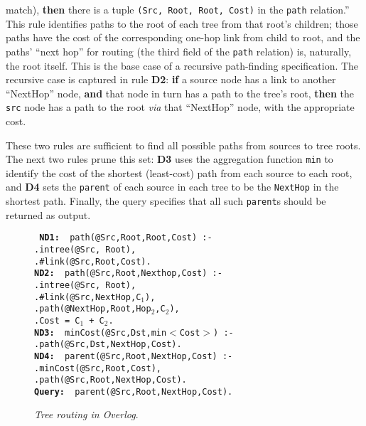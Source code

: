 \documentclass{vldb}
\newcommand{\datalogspace}{\textcolor[gray]{1}{.}\hspace{0.5in}}
\def\link{\texttt{\#link}\xspace}
\begin{document}
match), {\bf then} there is a tuple {\tt (Src, Root, Root, Cost)} in
the {\tt path} relation.''  This rule identifies paths to the root of
each tree from that root's children; those paths have the cost of the
corresponding one-hop link from child to root, and the paths' ``next
hop'' for routing (the third field of the {\tt path} relation) is,
naturally, the root itself.  This is the base case of a recursive
path-finding specification.  The recursive case is captured in rule
{\bf D2}: {\bf if} a source node has a link to another ``NextHop''
node, {\bf and} that node in turn has a path to the tree's root, {\bf
  then} the {\tt src} node has a path to the root {\em via} that
``NextHop'' node, with the appropriate cost.

These two rules are sufficient to find all possible paths from sources
to tree roots.  The next two rules prune this set: {\bf D3} uses the
aggregation function {\tt min} to identify
the cost of the shortest (least-cost) path from each source to each
root, and {\bf
  D4} sets the {\tt parent} of each source in each tree to be the
{\tt NextHop} in the shortest path.  Finally, the query specifies that
all such {\tt parent}s should be returned as output.

\begin{figure}[t]%
\begin{boxedminipage}{\linewidth}%
\footnotesize{\tt
{\bf ND1: } path(@Src,Root,Root,Cost) :- \\
\datalogspace intree(@Src, Root), \\
\datalogspace \link(@Src,Root,Cost). \\
{\bf ND2: } path(@Src,Root,Nexthop,Cost) :-  \\
\datalogspace intree(@Src, Root), \\
\datalogspace \link(@Src,NextHop,C$_{1}$), \\
\datalogspace path(@NextHop,Root,Hop$_{2}$,C$_{2}$), \\
\datalogspace Cost = C$_{1}$ + C$_{2}$.\\
{\bf ND3: } minCost(@Src,Dst,min$<$Cost$>$) :- \\
\datalogspace path(@Src,Dst,NextHop,Cost).\\
{\bf ND4: } parent(@Src,Root,NextHop,Cost) :- \\
\datalogspace minCost(@Src,Root,Cost), \\
\datalogspace path(@Src,Root,NextHop,Cost).\\
{\bf Query: } parent(@Src,Root,NextHop,Cost).
}
\vspace{-1em}
\small{\caption{\label{fig:ndlogeg}\emph{\small Tree routing
      in Overlog}.}}
\end{boxedminipage}
\end{figure}
\end{document}
